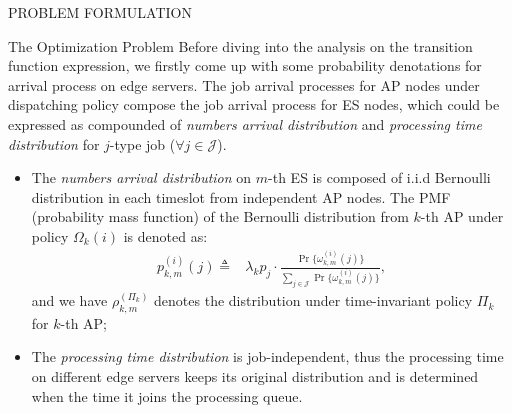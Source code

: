 \documentclass[10pt, conference, letterpaper]{IEEEtran}
\newcommand{\define}{\triangleq}
\newcommand{\jSpace}{\mathcal{J}}
\begin{document}
\begin{section}{PROBLEM FORMULATION}
\begin{subsection}{The Optimization Problem}
            Before diving into the analysis on the transition function expression, we firstly come up with some probability denotations for arrival process on edge servers.
            The job arrival processes for AP nodes under dispatching policy compose the job arrival process for ES nodes, which could be expressed as compounded of \emph{numbers arrival distribution} and \emph{processing time distribution} for $j$-type job ($\forall j\in\jSpace$).
            \begin{itemize}
                \item The \emph{numbers arrival distribution} on $m$-th ES is composed of i.i.d Bernoulli distribution in each timeslot from independent AP nodes. The PMF (probability mass function) of the Bernoulli distribution from $k$-th AP under policy $\Omega_k(i)$ is denoted as:
                \begin{align}
                    p_{k,m}^{(i)}(j) \define& \lambda_k p_j \cdot
                        \frac{
                                \Pr\{\omega_{k,m}^{(i)}(j)\}
                            }{
                                \sum_{j\in\jSpace} \Pr\{\omega_{k,m}^{(i)}(j)\}
                            },
                \end{align}
                and we have $\rho_{k,m}^{(\Pi_k)}$ denotes the distribution under time-invariant policy $\Pi_k$ for $k$-th AP;
                \item The \emph{processing time distribution} is job-independent, thus the processing time on different edge servers keeps its original distribution and is determined when the time it joins the processing queue.
            \end{itemize}
            

\end{subsection}
\end{section}
\end{document}
